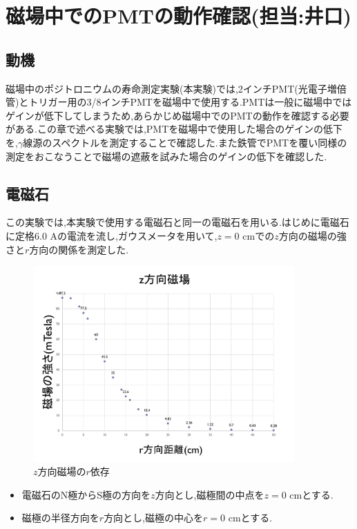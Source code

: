 \chapter{磁場中でのPMTの動作確認(担当:井口)}\label{PMT}

\section{動機}
磁場中のポジトロニウムの寿命測定実験(本実験)では,2インチPMT(光電子増倍管)とトリガー用の3/8インチPMTを磁場中で使用する.PMTは一般に磁場中ではゲインが低下してしまうため,あらかじめ磁場中でのPMTの動作を確認する必要がある.この章で述べる実験では,PMTを磁場中で使用した場合のゲインの低下を,$\gamma$線源のスペクトルを測定することで確認した.また鉄管でPMTを覆い同様の測定をおこなうことで磁場の遮蔽を試みた場合のゲインの低下を確認した.



\section{電磁石}
この実験では,本実験で使用する電磁石と同一の電磁石を用いる.はじめに電磁石に定格6.0 Aの電流を流し,ガウスメータを用いて,$z=0$ cmでの$z$方向の磁場の強さと$r$方向の関係を測定した.
\begin{figure}[htbp]
	\centering
		\includegraphics[width=10cm]{fig/iguchi/maggraph1.pdf}
	\caption{$z$方向磁場の$r$依存}
	\label{maggraph1}
\end{figure}

\begin{itemize}
       \item 電磁石のN極からS極の方向を$z$方向とし,磁極間の中点を$z=0$ cmとする.
       \item 磁極の半径方向を$r$方向とし,磁極の中心を$r=0$ cmとする.
\end{itemize}

